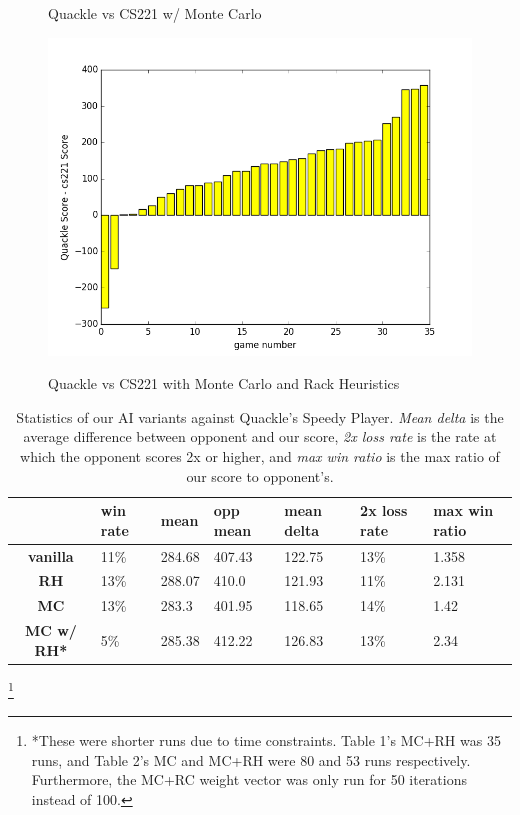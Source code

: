 \documentclass[12pt]{article}
\begin{document}
\begin{figure}[h!]
  \caption{\footnotesize{Quackle vs CS221 w/ Monte Carlo}}
  \endminipage
      \centering
  \includegraphics[scale=0.39]{../images/quacklegame_MC-RH_35}\\
   \caption{\footnotesize{Quackle vs CS221 with Monte Carlo and Rack
       Heuristics}}
  \endminipage{}
\end{figure}


\begin{table}[h!]
  \centering
  \begin{tabular}{c|l|l|l|l|l|l}
    \textbf{} & \textbf{win rate} & \textbf{mean} & \textbf{opp mean} & \textbf{mean delta} &  \textbf{2x loss rate} & \textbf{max win ratio} \\\hline
  \textbf{vanilla}   & 11\% & 284.68 & 407.43 & 122.75 & 13\% & 1.358\\
  \textbf{RH}        & 13\% & 288.07 & 410.0  & 121.93 & 11\% & 2.131\\
  \textbf{MC}        & 13\% & 283.3  & 401.95 & 118.65 & 14\% & 1.42 \\
  \textbf{MC w/ RH*} & 5\%  & 285.38 & 412.22 & 126.83 & 13\% & 2.34 \\
\end{tabular}
  \caption{Statistics of our AI variants against Quackle's Speedy
    Player. \emph{Mean delta} is the average difference between
    opponent and our score, \emph{2x loss rate} is the rate at which
    the opponent scores 2x or higher, and \emph{max win ratio} is the
    max ratio of our score to opponent's.}
\end{table}
\footnote[1]{*These were shorter runs due to time constraints. Table 1's MC+RH was 35 runs, and Table 2's MC and MC+RH were 80 and 53 runs respectively. Furthermore, the MC+RC weight vector was only run for 50 iterations instead of 100.}
\end{document}
